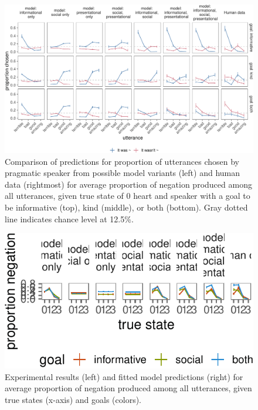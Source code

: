 \documentclass[oneside]{report}
\begin{document}
\begin{figure}[!h]

{\centering \includegraphics[width=\textwidth]{erica_yoon_dissertation_files/figure-latex/comparisonAll-1} 

}

\caption[Full comparison of model variants for all experimental conditions.]{Comparison of predictions for proportion of utterances chosen by pragmatic speaker from possible model variants (left) and human data (rightmost) for average proportion of negation produced among all utterances, given true state of 0 heart and speaker with a goal to be informative (top), kind (middle), or both (bottom). Gray dotted line indicates chance level at 12.5\%.}\label{fig:comparisonAll}
\end{figure}
\begin{figure}[!h]

{\centering \includegraphics[width=\textwidth]{erica_yoon_dissertation_files/figure-latex/negation-1} 

}

\caption[Comparison of experimental results and model predictions for expected proportion of negation.]{Experimental results (left) and fitted model predictions (right) for average proportion of negation produced among all utterances, given true states (x-axis) and goals (colors).}\label{fig:negation}
\end{figure}
\end{document}
